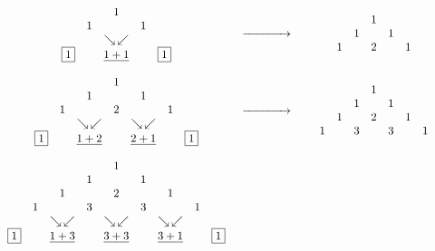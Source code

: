 \[ \begin{array}{ccc}

\begin{array}{ccccccccc} 
&	&	&	&	1	&	&	&	&	\\ 
&	&	&	1	&	&	1	&	&	&\\
&	&	&	&	\searrow \, \swarrow &	&	&	&	\\ 
&	&	\fbox{1}	&	&	\underline{1+1}	&	& 	\fbox{1}	&	&\\
\end{array} 

&

\xrightarrow{\hspace{.5in}}

&


\begin{array}{ccccccccc} 
&	&	&	&	1	&	&	&	&	\\ 
&	&	&	1	&	&	1	&	&	&\\
&	&	1	&	&	2	&	&1	&	&\\
\end{array} \\

&& \\

\begin{array}{ccccccccc} 
&	&	&	&	1	&	&	&	&	\\ 
&	&	&	1	&	&	1	&	&	&\\
&	&	1	&	&	2	&	&1	&	&\\ 
& &  & 	\searrow \, \swarrow & & 	\searrow \, \swarrow & &  & \\ 
&		\fbox{1}	&	&	\underline{1+2}	&	&	\underline{2+1}	&	&		\fbox{1}	&	\\
\end{array} 

&

\xrightarrow{\hspace{.5in}}

&

\begin{array}{ccccccccc} 
&	&	&	&	1	&	&	&	&	\\ 
&	&	&	1	&	&	1	&	&	&\\
&	&	1	&	&	2	&	&1	&	&\\ 
&	1	&	&	3	&	&	3	&	&	1	&	\\
\end{array} \\

&& \\

\begin{array}{ccccccccc} 
&	&	&	&	1	&	&	&	&	\\ 
&	&	&	1	&	&	1	&	&	&\\
&	&	1	&	& 2	&	&1	&	&\\ 
&	1	&	&	3	&	& 3	&	&	1	&	\\ 
&	&	\searrow \, \swarrow 	&	&	\searrow \, \swarrow 	&	&	\searrow \, \swarrow 	&	& \\ 
	\fbox{1}	&	&	\underline{1+3}	&	&	\underline{3+3}	&	&	\underline{3+1}	&	&		\fbox{1} \\ 


\end{array}
\end{array}\]

